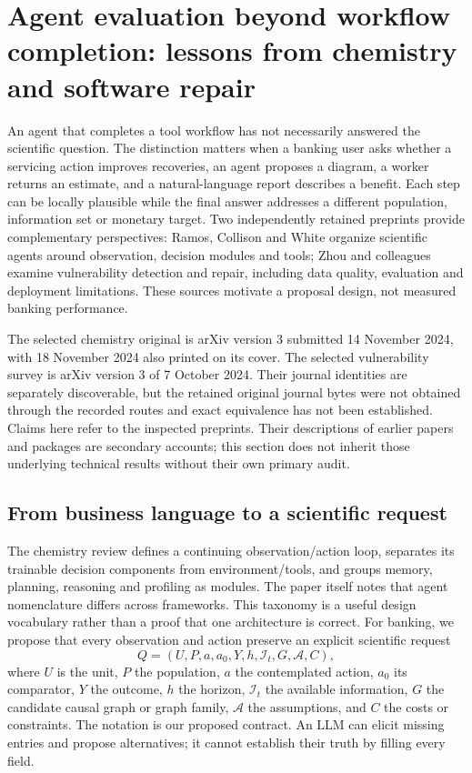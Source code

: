 \section[Agent evaluation beyond workflow completion]{Agent evaluation beyond workflow completion: lessons from chemistry and software repair}
\label{sec:exec25-cow}

An agent that completes a tool workflow has not necessarily answered the scientific question. The distinction matters when a banking user asks whether a servicing action improves recoveries, an agent proposes a diagram, a worker returns an estimate, and a natural-language report describes a benefit. Each step can be locally plausible while the final answer addresses a different population, information set or monetary target. Two independently retained preprints provide complementary perspectives: Ramos, Collison and White organize scientific agents around observation, decision modules and tools; Zhou and colleagues examine vulnerability detection and repair, including data quality, evaluation and deployment limitations. These sources motivate a proposal design, not measured banking performance.~\citep{exec25_cow_chemistry,exec25_cow_vulnerability}

The selected chemistry original is arXiv version 3 submitted 14 November 2024, with 18 November 2024 also printed on its cover. The selected vulnerability survey is arXiv version 3 of 7 October 2024. Their journal identities are separately discoverable, but the retained original journal bytes were not obtained through the recorded routes and exact equivalence has not been established. Claims here refer to the inspected preprints. Their descriptions of earlier papers and packages are secondary accounts; this section does not inherit those underlying technical results without their own primary audit.~\citep{exec25_cow_chemistry,exec25_cow_vulnerability}

\subsection{From business language to a scientific request}

The chemistry review defines a continuing observation/action loop, separates its trainable decision components from environment/tools, and groups memory, planning, reasoning and profiling as modules. The paper itself notes that agent nomenclature differs across frameworks. This taxonomy is a useful design vocabulary rather than a proof that one architecture is correct. For banking, we propose that every observation and action preserve an explicit scientific request
\[
 Q=(U,P,a,a_0,Y,h,\mathcal I_t,G,\mathcal A,C),
\]
where $U$ is the unit, $P$ the population, $a$ the contemplated action, $a_0$ its comparator, $Y$ the outcome, $h$ the horizon, $\mathcal I_t$ the available information, $G$ the candidate causal graph or graph family, $\mathcal A$ the assumptions, and $C$ the costs or constraints. The notation is our proposed contract. An LLM can elicit missing entries and propose alternatives; it cannot establish their truth by filling every field.~\citep{exec25_cow_chemistry,exec25_cow_reference}


